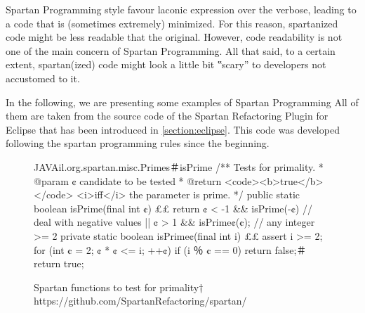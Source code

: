 Spartan Programming style favour laconic expression over the verbose, leading
to a code that is (sometimes extremely) minimized. For this reason, spartanized
code might be less readable that the original. However, code readability is not
one of the main concern of Spartan Programming. All that said, to a certain
extent, spartan(ized) code might look a little bit ‟scary” to developers not
accustomed to it.

In the following, we are presenting some examples of Spartan
Programming %
All of them are taken from the source code of the Spartan Refactoring Plugin
for Eclipse that has been introduced in \cref{section:eclipse}. This code was
developed following the spartan programming rules since the beginning.



%
%
\begin{figure}[h]
\label{figure:shock-2}
\caption{Spartan functions to test for primality†{%
      https://github.com/SpartanRefactoring/spartan/
      }
     }
\begin{Code}{JAVA}{il.org.spartan.misc.Primes＃isPrime}
/** Tests for primality.
  * @param ¢ candidate to be tested
  * @return <code><b>true</b></code> <i>iff</i> the parameter is prime. */
public static boolean isPrime(final int ¢) {££
  return ¢ < -1 && isPrime(-¢) // deal with negative values
      || ¢ > 1 && isPrime¢(¢); // any integer >= 2
}
private static boolean isPrime¢(final int i) {££
  assert i >= 2;
  for (int ¢ = 2; ¢ * ¢ <= i; ++¢)
    if (i ％ ¢ == 0)
      return false;＃
  return true;
}
\end{Code}
\end{figure}

